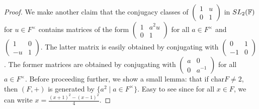 \begin{proof}
    We make another claim that the conjugacy classes of $\begin{pmatrix}
        1 & u \\ 0 & 1
    \end{pmatrix}$ in $SL_{2}(\mathbb{F})$ for $u \in F^{\times}$ contains matrices of the form $\begin{pmatrix}
        1 & a^{2}u \\ 0 & 1
    \end{pmatrix}$ for all $a \in F^{\times}$ and $\begin{pmatrix}
        1 & 0 \\ -u & 1
    \end{pmatrix}$. The latter matrix is easily obtained by conjugating with $\begin{pmatrix}
        0 & 1 \\ -1 & 0
    \end{pmatrix}$. The former matrices are obtained by conjugating with $\begin{pmatrix}
        a & 0 \\ 0 & a^{-1}
    \end{pmatrix}$ for all $a \in F^{\times}$. Before proceeding further, we show a small lemma: that if $\mathrm{char} F \neq 2$, then $(F,+)$ is generated by $\{a^{2} \mid a \in F^{\times}\}$. Easy to see since for all $x \in F$, we can write $x = \frac{(x+1)^{2} - (x-1)^{2}}{4}$.


\end{proof}
